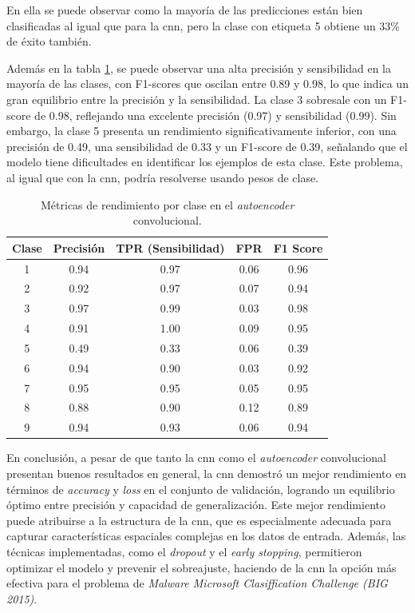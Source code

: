 En ella se puede observar como la mayoría de las predicciones están bien clasificadas al igual que para la \acrshort{cnn}, pero la clase con etiqueta 5 obtiene un 33\% de éxito también.
 
Además en la tabla \ref{tab:metrics}, se puede observar una alta precisión y sensibilidad en la mayoría de las clases, con F1-scores que oscilan entre 0.89 y 0.98, lo que indica un gran equilibrio entre la precisión y la sensibilidad. La clase 3 sobresale con un F1-score de 0.98, reflejando una excelente precisión (0.97) y sensibilidad (0.99). Sin embargo, la clase 5 presenta un rendimiento significativamente inferior, con una precisión de 0.49, una sensibilidad de 0.33 y un F1-score de 0.39, señalando que el modelo tiene dificultades en identificar los ejemplos de esta clase. Este problema, al igual que con la \acrshort{cnn}, podría resolverse usando pesos de clase. 


\begin{table}[H]
\centering
\begin{tabular}{|c|c|c|c|c|}
\hline
Clase & Precisión & TPR (Sensibilidad) & FPR & F1 Score \\ \hline
1 & 0.94 & 0.97 & 0.06 & 0.96 \\ \hline
2 & 0.92 & 0.97 & 0.07 & 0.94 \\ \hline
3 & 0.97 & 0.99 & 0.03 & 0.98 \\ \hline
4 & 0.91 & 1.00 & 0.09 & 0.95 \\ \hline
5 & 0.49 & 0.33 & 0.06 & 0.39 \\ \hline
6 & 0.94 & 0.90 & 0.03 & 0.92 \\ \hline
7 & 0.95 & 0.95 & 0.05 & 0.95 \\ \hline
8 & 0.88 & 0.90 & 0.12 & 0.89 \\ \hline
9 & 0.94 & 0.93 & 0.06 & 0.94 \\ \hline
\end{tabular}
\caption{Métricas de rendimiento por clase en el \textit{autoencoder} convolucional.}
\label{tab:metrics}
\end{table}

En conclusión, a pesar de que tanto la \acrshort{cnn} como el \textit{autoencoder} convolucional presentan buenos resultados en general, la \acrshort{cnn} demostró un mejor rendimiento en términos de \textit{accuracy} y \textit{loss} en el conjunto de validación, logrando un equilibrio óptimo entre precisión y capacidad de generalización. Este mejor rendimiento puede atribuirse a la estructura de la \acrshort{cnn}, que es especialmente adecuada para capturar características espaciales complejas en los datos de entrada. Además, las técnicas implementadas, como el \textit{dropout} y el \textit{early stopping}, permitieron optimizar el modelo y prevenir el sobreajuste, haciendo de la \acrshort{cnn} la opción más efectiva para el problema de \textit{Malware Microsoft Clasiffication Challenge (BIG 2015)}.





